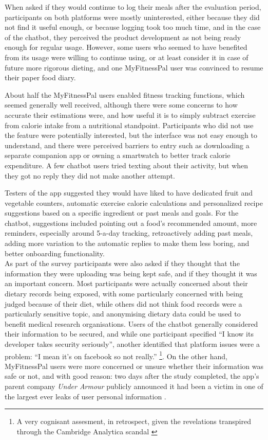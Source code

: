 When asked if they would continue to log their meals after the evaluation period, participants on both platforms were mostly uninterested, either because they did not find it useful enough, or because logging took too much time, and in the case of the chatbot, they perceived the product development as not being ready enough for regular usage. However, some users who seemed to have benefited from its usage were willing to continue using, or at least consider it in case of future more rigorous dieting, and one MyFitnessPal user was convinced to resume their paper food diary. 

About half the MyFitnessPal users enabled fitness tracking functions, which seemed generally well received, although there were some concerns to how accurate their estimations were, and how useful it is to simply subtract exercise from calorie intake from a nutritional standpoint. Participants who did not use the feature were potentially interested, but the interface was not easy enough to understand, and there were perceived barriers to entry such as downloading a separate companion app or owning a smartwatch to better track calorie expenditure. A few chatbot users tried texting about their activity, but when they got no reply they did not make another attempt.

Testers of the app suggested they would have liked to have dedicated fruit and vegetable counters, automatic exercise calorie calculations and personalized recipe suggestions based on a specific ingredient or past meals and goals. For the chatbot, suggestions included pointing out a food's recommended amount, more reminders, especially around 5-a-day tracking, retroactively adding past meals, adding more variation to the automatic replies to make them less boring, and better onboarding functionality. \\
As part of the survey participants were  also asked if they thought that the information they were uploading was being kept safe, and if they thought it was an important concern. Most participants were actually concerned about their dietary records being exposed, with some particularly concerned with being judged because of their diet, while others did not think food records were a particularly sensitive topic, and anonymising dietary data could be used to benefit medical research organisations. Users of the chatbot generally considered their information to be secured, and while one participant specified ``I know its developer takes security seriously'', another identified that platform issues were a problem: ``I mean it's on facebook so not really.'' \footnote{A very cognisant assesment, in retrospect, given the revelations transpired through the Cambridge Analytica scandal \cite{cambridgeanalytica}}. On the other hand, MyFitnessPal users were more concerned or unsure whether their information was safe or not, and with good reason: two days after the study completed, the app's parent company \textit{Under Armour} publicly announced it had been a victim in one of the largest ever leaks of user personal information \cite{underarmour}.
